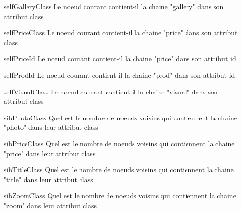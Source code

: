 \documentclass{article}
\begin{document}
\begin{itemize}
    \item[selfGalleryClass] Le noeud courant contient-il la chaine "gallery" dans son attribut class
    \item[selfPriceClass] Le noeud courant contient-il la chaine "price" dans son attribut class
    \item[selfPriceId] Le noeud courant contient-il la chaine "price" dans son attribut id
    \item[selfProdId] Le noeud courant contient-il la chaine "prod" dans son attribut id
    \item[selfVisualClass] Le noeud courant contient-il la chaine "visual" dans son attribut class
    \item[sibPhotoClass] Quel est le nombre de noeuds voisins qui contiennent la chaine "photo" dans leur attribut class
    \item[sibPriceClass] Quel est le nombre de noeuds voisins qui contiennent la chaine "price" dans leur attribut class
    \item[sibTitleClass] Quel est le nombre de noeuds voisins qui contiennent la chaine "title" dans leur attribut class
    \item[sibZoomClass] Quel est le nombre de noeuds voisins qui contiennent la chaine "zoom" dans leur attribut class
\end{itemize}
\end{document}
